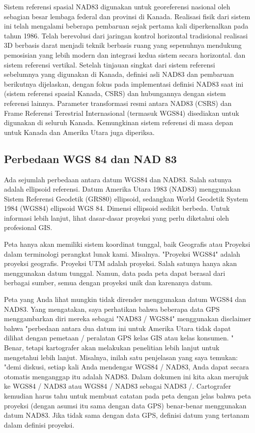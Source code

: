Sistem referensi spasial NAD83 digunakan untuk georeferensi nasional oleh sebagian besar lembaga federal dan provinsi di Kanada. Realisasi fisik dari sistem ini telah mengalami beberapa pembaruan sejak pertama kali diperkenalkan pada tahun 1986. Telah berevolusi dari jaringan kontrol horizontal tradisional realisasi 3D berbasis darat menjadi teknik berbasis ruang yang sepenuhnya mendukung pemosisian yang lebih modern dan integrasi kedua sistem secara horizontal. dan sistem referensi vertikal. Setelah tinjauan singkat dari sistem referensi sebelumnya yang digunakan di Kanada, definisi asli NAD83 dan pembaruan berikutnya dijelaskan, dengan fokus pada implementasi definisi NAD83 saat ini (sistem referensi spasial Kanada, CSRS) dan hubungannya dengan sistem referensi lainnya. Parameter transformasi resmi antara NAD83 (CSRS) dan Frame Referensi Terestrial Internasional (termasuk WGS84) disediakan untuk digunakan di seluruh Kanada. Kemungkinan sistem referensi di masa depan untuk Kanada dan Amerika Utara juga diperiksa.

\subsection{Perbedaan WGS 84 dan NAD 83}
Ada sejumlah perbedaan antara datum WGS84 dan NAD83. Salah satunya adalah ellipsoid referensi. Datum Amerika Utara 1983 (NAD83) menggunakan Sistem Referensi Geodetik (GRS80) ellipsoid, sedangkan World Geodetik System 1984 (WGS84) ellipsoid WGS 84. Dimensi ellipsoid sedikit berbeda. Untuk informasi lebih lanjut, lihat dasar-dasar proyeksi yang perlu diketahui oleh profesional GIS.

Peta hanya akan memiliki sistem koordinat tunggal, baik Geografis atau Proyeksi dalam terminologi perangkat lunak kami. Misalnya. "Proyeksi WGS84" adalah proyeksi geografis. Proyeksi UTM adalah proyeksi. Salah satunya hanya akan menggunakan datum tunggal. Namun, data pada peta dapat berasal dari berbagai sumber, semua dengan proyeksi unik dan karenanya datum.

Peta yang Anda lihat mungkin tidak dirender menggunakan datum WGS84 dan NAD83. Yang mengatakan, saya perhatikan bahwa beberapa data GPS menggambarkan diri mereka sebagai "NAD83 / WGS84" menggunakan disclaimer bahwa "perbedaan antara dua datum ini untuk Amerika Utara tidak dapat dilihat dengan pemetaan / peralatan GPS kelas GIS atau kelas konsumen. " Benar, tetapi kartografer akan melakukan penelitian lebih lanjut untuk mengetahui lebih lanjut. Misalnya, inilah satu penjelasan yang saya temukan: "demi diskusi, setiap kali Anda mendengar WGS84 / NAD83, Anda dapat secara otomatis menganggap itu adalah NAD83. Dalam dokumen ini kita akan merujuk ke WGS84 / NAD83 atau WGS84 / NAD83 sebagai NAD83 /. Cartografer kemudian harus tahu untuk membuat catatan pada peta dengan jelas bahwa peta proyeksi (dengan asumsi itu sama dengan data GPS) benar-benar menggunakan datum NAD83. Jika tidak sama dengan data GPS, definisi datum yang tertanam dalam definisi proyeksi.

